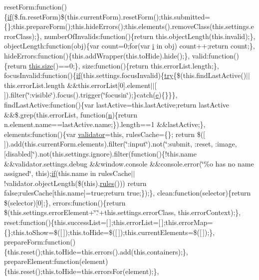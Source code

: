 \begin{DoxyCompactItemize}
reset\+Form\+:function()\{\hyperlink{_scripts_2respond_8min_8js_a93851d60dd037a83509a1757b9ee7b66}{if}(\$.fn.\+reset\+Form)\$(this.\+current\+Form).reset\+Form();this.\+submitted=\{\};this.\+prepare\+Form();this.\+hide\+Errors();this.\+elements().remove\+Class(this.\+settings.\+error\+Class);\}, number\+Of\+Invalids\+:function()\{return this.\+object\+Length(this.\+invalid);\}, object\+Length\+:function(obj)\{var count=0;for(var \hyperlink{_scripts_2respond_8min_8js_a5e25b1d1bed9ab5f3174b76d6a722180}{i} in obj) count++;return count;\}, hide\+Errors\+:function()\{this.\+add\+Wrapper(this.\+to\+Hide).hide();\}, valid\+:function()\{return \hyperlink{_scripts_2jquery-1_810_82_8js_afa6806c6ee5e63d5177f1dcc082ba6bc}{this.\+size}()==0;\}, size\+:function()\{return this.\+error\+List.\+length;\}, focus\+Invalid\+:function()\{\hyperlink{_scripts_2respond_8min_8js_a93851d60dd037a83509a1757b9ee7b66}{if}(this.\+settings.\+focus\+Invalid)\{\hyperlink{_scripts_2jquery-1_810_82_8js_abe4cc9788f52e49485473dc699537388}{try}\{\$(this.\+find\+Last\+Active()$\vert$$\vert$this.\+error\+List.\+length \&\&this.\+error\+List\mbox{[}0\mbox{]}.element$\vert$$\vert$\mbox{[}$\,$\mbox{]}).filter(\char`\"{}\+:visible\char`\"{}).focus().trigger(\char`\"{}focusin\char`\"{});\}catch(\hyperlink{_scripts_2respond_8min_8js_a2c038346d47955cbe2cb91e338edd7e1}{e})\{\}\}\}, find\+Last\+Active\+:function()\{var last\+Active=this.\+last\+Active;return last\+Active \&\&\$.grep(this.\+error\+List, function(\hyperlink{_scripts_2ai_80_822_89-build00167_8min_8js_afc984c4f6c68ce30a0af99006f5f8d27}{n})\{return n.\+element.\+name==last\+Active.\+name;\}).length==1 \&\&last\+Active;\}, elements\+:function()\{var \hyperlink{_scripts_2jquery_8validate_8js_a2dc8272bb221cdffcccbd20db038f172}{validator}=this, rules\+Cache=\{\};   return \$(\mbox{[}$\,$\mbox{]}).add(this.\+current\+Form.\+elements).filter(\char`\"{}\+:input\char`\"{}).not(\char`\"{}\+:submit, \+:reset, \+:image, \mbox{[}disabled\mbox{]}\char`\"{}).not(this.\+settings.\+ignore).filter(function()\{!this.\+name \&\&validator.\+settings.\+debug \&\&window.\+console \&\&console.\+error(\char`\"{}\%o has no name assigned\char`\"{}, this);\hyperlink{_scripts_2respond_8min_8js_a93851d60dd037a83509a1757b9ee7b66}{if}(this.\+name in rules\+Cache$\vert$$\vert$!validator.\+object\+Length(\$(this).\hyperlink{_scripts_2respond_8js_ada87c2e257bc5ff6e77cdbc23ed986a3}{rules}())) return false;rules\+Cache\mbox{[}this.\+name\mbox{]}=true;return true;\});\}, clean\+:function(selector)\{return \$(selector)\mbox{[}0\mbox{]};\}, errors\+:function()\{return \$(this.\+settings.\+error\+Element+\char`\"{}.\char`\"{}+this.\+settings.\+error\+Class, this.\+error\+Context);\}, reset\+:function()\{this.\+success\+List=\mbox{[}$\,$\mbox{]};this.\+error\+List=\mbox{[}$\,$\mbox{]};this.\+error\+Map=\{\};this.\+to\+Show=\$(\mbox{[}$\,$\mbox{]});this.\+to\+Hide=\$(\mbox{[}$\,$\mbox{]});this.\+current\+Elements=\$(\mbox{[}$\,$\mbox{]});\}, prepare\+Form\+:function()\{this.\+reset();this.\+to\+Hide=this.\+errors().add(this.\+containers);\}, prepare\+Element\+:function(element)\{this.\+reset();this.\+to\+Hide=this.\+errors\+For(element);\}, 
\end{DoxyCompactItemize}
